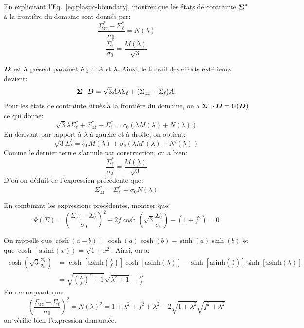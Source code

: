 \documentclass[french,12pt]{exam}
\begin{document}
\begin{questions}
\question En explicitant l'Eq.~\eqref{eq:plastic-boundary}, montrer que les états de contrainte $\boldsymbol{\Sigma}^*$ à la frontière du domaine sont donnés par:
  \begin{equation}
    \frac{\Sigma_{zz}^* - \Sigma_\ell^*}{\sigma_0} = N(\lambda)
\end{equation}  
    \begin{equation}
    \frac{\Sigma_\ell^*}{\sigma_0} = \frac{M(\lambda)}{\sqrt{3}}
\end{equation}  
\begin{solution}
$\boldsymbol{D}$ est à présent paramétré par $A$ et $\lambda$. Ainsi, le travail des efforts extérieurs devient:
$$\boldsymbol{\Sigma} \cdot \boldsymbol{D} = \sqrt{3}A\lambda\Sigma_\ell + (\Sigma_{zz}-\Sigma_\ell)A.$$
Pour les états de contrainte situés à la frontière du domaine, on a $\boldsymbol{\Sigma}^* \cdot \boldsymbol{D} = \Pi(\boldsymbol{D})$ ce qui donne:
$$  \sqrt{3}\lambda\Sigma_\ell^* + \Sigma_{zz}^*-\Sigma_\ell^* = \sigma_0 \left(\lambda M(\lambda)+N(\lambda)\right)$$
En dérivant par rapport à $\lambda$ à gauche et à droite, on obtient:
$$ \sqrt{3}\Sigma_\ell^* = \sigma_0 M(\lambda)+ \sigma_0(\lambda M'(\lambda)+N'(\lambda))$$
Comme le dernier terme s'annule par construction, on a bien:
$$\frac{\Sigma_\ell^*}{\sigma_0} = \frac{M(\lambda)}{\sqrt{3}}$$
D'où on déduit de l'expression précédente que:
$$\Sigma_{zz}^*-\Sigma_\ell^* = \sigma_0 N(\lambda)$$
\end{solution}
  
\question En combinant les expressions précédentes, montrer que:
  \begin{equation}
   \Phi\left( \Sigma     \right)  = \left(  \frac{\Sigma_{zz} - \Sigma_\ell}{\sigma_0} \right)^2 + 2f \cosh{\left(  \sqrt{3} \frac{\Sigma_\ell}{\sigma_0} \right)} - (1 + f^2) = 0
\label{eq4}
  \end{equation}  
\begin{solution}
On rappelle que $\cosh(a-b)=\cosh(a)\cosh(b)-\sinh(a)\sinh(b)$ et que $\cosh(\mathrm{asinh}(x)) = \sqrt{1+x^2}$. Ainsi, on a:
\begin{align*}
\cosh{\left(  \sqrt{3} \frac{\Sigma_\ell}{\sigma_0} \right)} &= \cosh{\left[\mathrm{asinh}{\left( \frac{\lambda}{f} \right)}\right]}\cosh[\mathrm{asinh}{(\lambda)}] - \sinh{\left[\mathrm{asinh}{\left( \frac{\lambda}{f} \right)}\right]}\sinh[\mathrm{asinh}{(\lambda)}]\\
&= \sqrt{\left(\frac{\lambda}{f} \right)^2+1}\sqrt{\lambda^2+1} - \frac{\lambda^2}{f}
\end{align*}
En remarquant que:
$$\left(  \frac{\Sigma_{zz} - \Sigma_\ell}{\sigma_0} \right)^2 = N(\lambda)^2 = 1+\lambda^2+f^2+\lambda^2 -2\sqrt{1+\lambda^2}\sqrt{f^2+\lambda^2}$$
on vérifie bien l'expression demandée.
\end{solution}
\end{questions}
\end{document}
